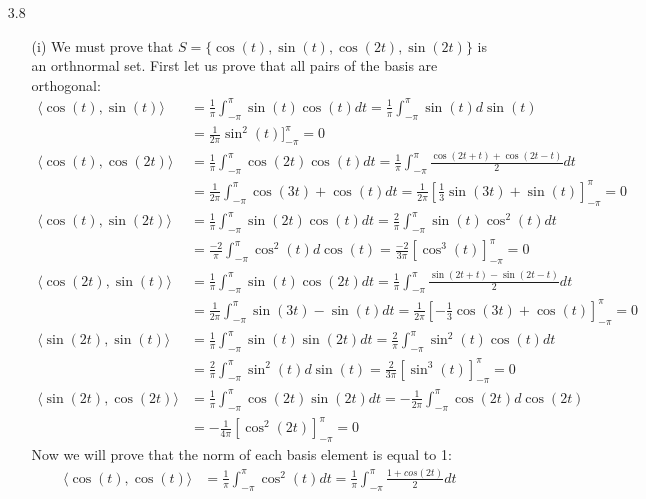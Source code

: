 \documentclass[letterpaper,12pt]{article}
\theoremstyle{definition}
\begin{document}
\begin{enumerate}
    \item[3.8]
      \begin{enumerate}
        \item[(i)]
        We must prove that $S = \{\cos(t), \sin(t), \cos(2t), \sin(2t)\}$ is an orthnormal set. First let us prove that all pairs of the basis are orthogonal:
          \begin{align*}
            \langle \cos(t), \sin(t) \rangle &= \frac{1}{\pi}\int_{-\pi}^\pi \sin(t)\cos(t)dt = \frac{1}{\pi}\int_{-\pi}^\pi \sin(t)d\sin(t) \\
            &= \frac{1}{2\pi} \sin^2(t)]_{-\pi}^\pi = 0 \\
            \langle \cos(t), \cos(2t) \rangle &=\frac{1}{\pi}\int_{-\pi}^\pi \cos(2t)\cos(t)dt =\frac{1}{\pi}\int_{-\pi}^\pi \frac{\cos(2t+t) + \cos(2t-t)}{2}dt \\
            &=\frac{1}{2\pi} \int_{-\pi}^\pi \cos(3t) + \cos(t) dt = \frac{1}{2\pi} [\frac{1}{3}\sin(3t) + \sin(t)]_{-\pi}^\pi = 0 \\
            \langle \cos(t), \sin(2t) \rangle &= \frac{1}{\pi}\int_{-\pi}^\pi \sin(2t)\cos(t)dt = \frac{2}{\pi}\int_{-\pi}^\pi \sin(t)\cos^2(t)dt \\
            &= \frac{-2}{\pi}\int_{-\pi}^\pi \cos^2(t)d\cos(t) = \frac{-2}{3\pi} [\cos^3(t)]_{-\pi}^\pi = 0 \\
            \langle \cos(2t), \sin(t) \rangle &= \frac{1}{\pi}\int_{-\pi}^\pi \sin(t)\cos(2t)dt = \frac{1}{\pi}\int_{-\pi}^\pi \frac{\sin(2t+t) - \sin(2t-t)}{2}dt \\
            &=\frac{1}{2\pi} \int_{-\pi}^\pi \sin(3t) - \sin(t) dt = \frac{1}{2\pi} [-\frac{1}{3}\cos(3t) + \cos(t)]_{-\pi}^\pi = 0 \\
            \langle \sin(2t), \sin(t) \rangle &= \frac{1}{\pi}\int_{-\pi}^\pi \sin(t)\sin(2t)dt = \frac{2}{\pi}\int_{-\pi}^\pi \sin^2(t)\cos(t)dt \\
            &= \frac{2}{\pi}\int_{-\pi}^\pi \sin^2(t)d\sin(t) = \frac{2}{3\pi}[\sin^3(t)]_{-\pi}^\pi = 0 \\
            \langle \sin(2t), \cos(2t) \rangle &=  \frac{1}{\pi}\int_{-\pi}^\pi \cos(2t)\sin(2t)dt = -\frac{1}{2\pi}\int_{-\pi}^\pi \cos(2t)d\cos(2t) \\
            &= -\frac{1}{4\pi} [\cos^2(2t)]_{-\pi}^\pi = 0
          \end{align*}
          Now we will prove that the norm of each basis element is equal to 1:
          \begin{align*}
              \langle \cos(t), \cos(t) \rangle &= \frac{1}{\pi}\int_{-\pi}^\pi \cos^2(t)dt = \frac{1}{\pi}\int_{-\pi}^\pi \frac{1 + cos(2t)}{2}dt \\

\end{align*}
\end{enumerate}
\end{enumerate}
\end{document}

